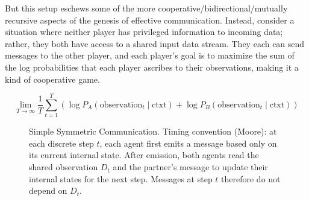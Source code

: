 \documentclass{article}
\theoremstyle{definition}
\begin{document}
But this setup eschews some of the more cooperative/bidirectional/mutually recursive aspects of the genesis of effective communication.
Instead, consider a situation where neither player has privileged information to incoming data; rather, they both have access to a shared input data stream. They each can send messages to the other player, and each player's goal is to maximize the sum of the log probabilities that each player ascribes to their observations, making it a kind of cooperative game.

$$
\lim_{T \to \infty} \frac{1}{T} \sum_{t=1}^{T} \left( \log P_A(\text{observation}_t \mid \text{ctxt}) + \log P_B(\text{observation}_t \mid \text{ctxt}) \right)
$$

\bigskip

\begin{figure}
\begin{center}
\end{center}
\caption{Simple Symmetric Communication. Timing convention (Moore): at each discrete step $t$, each agent first emits a message based only on its current internal state. After emission, both agents read the shared observation $D_t$ and the partner's message to update their internal states for the next step. Messages at step $t$ therefore do not depend on $D_t$.}
\end{figure}
\end{document}
